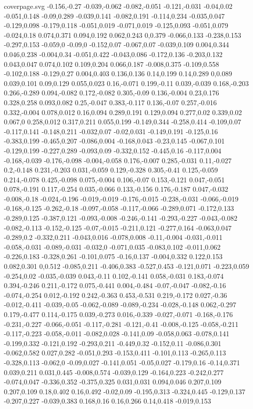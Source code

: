 \begin{filecontents}[noheader]{coverpage.svg}
-0.156,-0.27 -0.039,-0.062 -0.082,-0.051 -0.121,-0.031 -0.04,0.02 -0.051,0.148 -0.09,0.289 -0.039,0.141 -0.082,0.191 -0.114,0.234 -0.035,0.047 -0.129,0.098 -0.179,0.118 -0.051,0.019 -0.071,0.019 -0.125,0.093 -0.051,0.079 -0.024,0.18 0.074,0.371 0.094,0.192 0.062,0.243 0,0.379 -0.066,0.133 -0.238,0.153 -0.297,0.153 -0.059,0 -0.09,0 -0.152,0.07 -0.067,0.07 -0.039,0.109 0.004,0.344 0.046,0.238 -0.004,0.34 -0.051,0.422 -0.043,0.086 -0.172,0.136 -0.203,0.132 0.043,0.047 0.074,0.102 0.109,0.204 0.066,0.187 -0.008,0.375 -0.109,0.558 -0.102,0.188 -0.129,0.27 0.004,0.403 0.136,0.136 0.14,0.199 0.14,0.289 0,0.089 0.039,0.101 0.09,0.129 0.055,0.023 0.16,-0.071 0.199,-0.11 0.039,-0.039 0.168,-0.203 0.266,-0.289 0.094,-0.082 0.172,-0.082 0.305,-0.09 0.136,-0.004 0.23,0.176 0.328,0.258 0.093,0.082 0.25,-0.047 0.383,-0.117 0.136,-0.07 0.257,-0.016 0.332,-0.004 0.078,0.012 0.16,0.094 0.289,0.191 0.129,0.094 0.277,0.02 0.339,0.02 0.067,0 0.258,0.012 0.317,0.211 0.055,0.199 -0.149,0.344 -0.258,0.414 -0.109,0.07 -0.117,0.141 -0.148,0.211 -0.032,0.07 -0.02,0.031 -0.149,0.191 -0.125,0.16 -0.383,0.199 -0.465,0.207 -0.086,0.004 -0.168,0.043 -0.23,0.145 -0.067,0.101 -0.129,0.199 -0.227,0.289 -0.093,0.09 -0.332,0.152 -0.445,0.16 -0.117,0.004 -0.168,-0.039 -0.176,-0.098 -0.004,-0.058 0.176,-0.007 0.285,-0.031 0.11,-0.027 0.2,-0.148 0.231,-0.203 0.031,-0.059 0.129,-0.328 0.305,-0.41 0.125,-0.059 0.214,-0.078 0.425,-0.098 0.075,-0.004 0.106,-0.07 0.153,-0.121 0.047,-0.051 0.078,-0.191 0.117,-0.254 0.035,-0.066 0.133,-0.156 0.176,-0.187 0.047,-0.032 -0.008,-0.18 -0.024,-0.196 -0.019,-0.019 -0.176,-0.015 -0.238,-0.031 -0.066,-0.019 -0.168,-0.125 -0.262,-0.18 -0.097,-0.058 -0.117,-0.066 -0.289,0.071 -0.172,0.133 -0.289,0.125 -0.387,0.121 -0.093,-0.008 -0.246,-0.141 -0.293,-0.227 -0.043,-0.082 -0.082,-0.113 -0.152,-0.125 -0.07,-0.015 -0.211,0.121 -0.277,0.164 -0.063,0.047 -0.289,0.2 -0.332,0.211 -0.043,0.016 -0.078,0.008 -0.11,-0.004 -0.031,-0.011 -0.058,-0.031 -0.089,-0.031 -0.032,0 -0.071,0.035 -0.083,0.102 -0.011,0.062 -0.226,0.183 -0.328,0.261 -0.101,0.075 -0.16,0.137 -0.004,0.332 0.122,0.153 0.082,0.301 0,0.512 -0.085,0.211 -0.406,0.383 -0.527,0.453 -0.121,0.071 -0.223,0.059 -0.254,0.02 -0.035,-0.039 0.043,-0.11 0.102,-0.141 0.058,-0.031 0.183,-0.074 0.394,-0.246 0.211,-0.172 0.075,-0.441 0.004,-0.484 -0.07,-0.047 -0.082,-0.16 -0.074,-0.254 0.012,-0.192 0.242,-0.363 0.453,-0.531 0.219,-0.172 0.027,-0.36 -0.012,-0.411 -0.039,-0.05 -0.062,-0.089 -0.089,-0.234 -0.028,-0.148 0.062,-0.297 0.179,-0.477 0.114,-0.175 0.039,-0.273 0.016,-0.339 -0.027,-0.071 -0.168,-0.176 -0.231,-0.227 -0.066,-0.051 -0.117,-0.281 -0.121,-0.41 -0.008,-0.125 -0.058,-0.211 -0.117,-0.223 -0.058,-0.011 -0.082,0.028 -0.141,0.09 -0.058,0.063 -0.078,0.141 -0.199,0.332 -0.121,0.192 -0.293,0.211 -0.449,0.32 -0.152,0.11 -0.086,0.301 -0.062,0.582 0.027,0.282 -0.051,0.293 -0.153,0.411 -0.101,0.113 -0.265,0.113 -0.328,0.113 -0.062,0 -0.09,0.027 -0.141,0.051 -0.05,0.027 -0.179,0.16 -0.14,0.371 0.039,0.211 0.031,0.445 -0.008,0.574 -0.039,0.129 -0.164,0.223 -0.242,0.277 -0.074,0.047 -0.336,0.352 -0.375,0.325 0.031,0.031 0.094,0.046 0.207,0.109 0.207,0.109 0.18,0.402 0.16,0.492 -0.02,0.09 -0.195,0.313 -0.324,0.445 -0.129,0.137 -0.207,0.227 -0.039,0.383 0.168,0.16 0.16,0.266 0.14,0.418 -0.019,0.153 
\end{filecontents}
